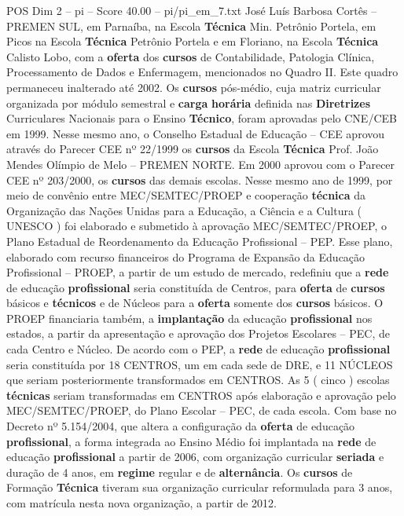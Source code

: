 \begin{textsample}{POS Dim 2 – pi – Score 40.00 – pi/pi\_em\_7.txt}
José Luís Barbosa Cortês – PREMEN SUL, em Parnaíba, na Escola \textbf{Técnica} Min.
Petrônio Portela, em Picos na Escola \textbf{Técnica} Petrônio Portela e em Floriano, na Escola \textbf{Técnica} Calisto Lobo, com a \textbf{oferta} dos \textbf{cursos} de Contabilidade, Patologia Clínica, Processamento de Dados e Enfermagem, mencionados no Quadro II.
Este quadro permaneceu inalterado até 2002.
Os \textbf{cursos} pós-médio, cuja matriz curricular organizada por módulo semestral e \textbf{carga} \textbf{horária} definida nas \textbf{Diretrizes} Curriculares Nacionais para o Ensino \textbf{Técnico}, foram aprovadas pelo CNE/CEB em 1999.
Nesse mesmo ano, o Conselho Estadual de Educação – CEE aprovou através do Parecer CEE nº 22/1999 os \textbf{cursos} da Escola \textbf{Técnica} Prof.
João Mendes Olímpio de Melo – PREMEN NORTE.
Em 2000 aprovou com o Parecer CEE nº 203/2000, os \textbf{cursos} das demais escolas.
Nesse mesmo ano de 1999, por meio de convênio entre MEC/SEMTEC/PROEP e cooperação \textbf{técnica} da Organização das Nações Unidas para a Educação, a Ciência e a Cultura ( UNESCO ) foi elaborado e submetido à aprovação MEC/SEMTEC/PROEP, o Plano Estadual de Reordenamento da Educação Profissional – PEP.
Esse plano, elaborado com recurso financeiros do Programa de Expansão da Educação Profissional – PROEP, a partir de um estudo de mercado, redefiniu que a \textbf{rede} de educação \textbf{profissional} seria constituída de Centros, para \textbf{oferta} de \textbf{cursos} básicos e \textbf{técnicos} e de Núcleos para a \textbf{oferta} somente dos \textbf{cursos} básicos.
O PROEP financiaria também, a \textbf{implantação} da educação \textbf{profissional} nos estados, a partir da apresentação e aprovação dos Projetos Escolares – PEC, de cada Centro e Núcleo.
De acordo com o PEP, a \textbf{rede} de educação \textbf{profissional} seria constituída por 18 CENTROS, um em cada sede de DRE, e 11 NÚCLEOS que seriam posteriormente transformados em CENTROS.
As 5 ( cinco ) escolas \textbf{técnicas} seriam transformadas em CENTROS após elaboração e aprovação pelo MEC/SEMTEC/PROEP, do Plano Escolar – PEC, de cada escola.
Com base no Decreto nº 5.154/2004, que altera a configuração da \textbf{oferta} de educação \textbf{profissional}, a forma integrada ao Ensino Médio foi implantada na \textbf{rede} de educação \textbf{profissional} a partir de 2006, com organização curricular \textbf{seriada} e duração de 4 anos, em \textbf{regime} regular e de \textbf{alternância}.
Os \textbf{cursos} de Formação \textbf{Técnica} tiveram sua organização curricular reformulada para 3 anos, com matrícula nesta nova organização, a partir de 2012.

\end{textsample}
